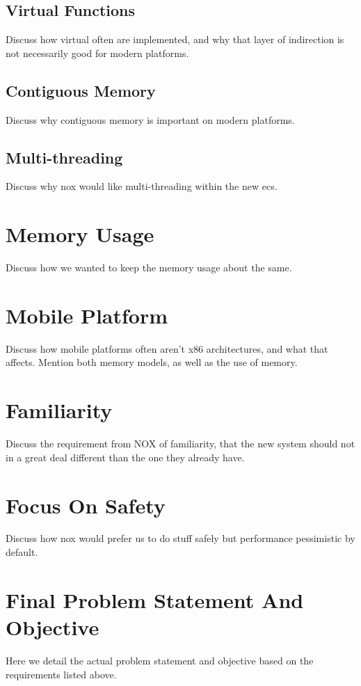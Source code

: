 \subsection{Virtual Functions}
Discuss how virtual often are implemented, and why that layer of indirection is not necessarily good for modern platforms.

\subsection{Contiguous Memory}
Discuss why contiguous memory is important on modern platforms.

\subsection{Multi-threading}
Discuss why nox would like multi-threading within the new ecs.

\section{Memory Usage}
Discuss how we wanted to keep the memory usage about the same.

\section{Mobile Platform}
Discuss how mobile platforms often aren't x86 architectures, and what that affects.
Mention both memory models, as well as the use of memory.

\section{Familiarity}
Discuss the requirement from NOX of familiarity, that the new system should not in a great deal different
than the one they already have.

\section{Focus On Safety}
Discuss how nox would prefer us to do stuff safely but performance pessimistic by default.

\section{Final Problem Statement And Objective}
Here we detail the actual problem statement and objective based on the requirements listed above.

